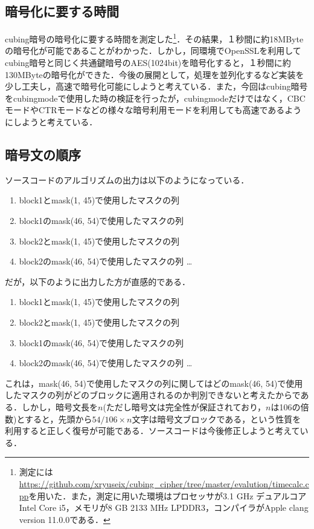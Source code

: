 \documentclass[a4j,titlepage]{jsarticle}
\begin{document}
\subsection{暗号化に要する時間}
cubing暗号の暗号化に要する時間を測定した\footnote{測定には\url{https://github.com/xryuseix/cubing_cipher/tree/master/evalution/timecalc.cpp}を用いた．また，測定に用いた環境はプロセッサが3.1 GHz デュアルコアIntel Core i5，メモリが8 GB 2133 MHz LPDDR3，コンパイラがApple clang version 11.0.0である．}．その結果，１秒間に約18MByteの暗号化が可能であることがわかった．しかし，同環境でOpenSSLを利用してcubing暗号と同じく共通鍵暗号のAES(1024bit)を暗号化すると，１秒間に約130MByteの暗号化ができた．今後の展開として，処理を並列化するなど実装を少し工夫し，高速で暗号化可能にしようと考えている．また，今回はcubing暗号をcubingmodeで使用した時の検証を行ったが，cubingmodeだけではなく，CBCモードやCTRモードなどの様々な暗号利用モードを利用しても高速であるようにしようと考えている．

\subsection{暗号文の順序}
ソースコードのアルゴリズムの出力は以下のようになっている．\\
\begin{screen}
  \begin{enumerate}
    \item block1とmask(\phantom{0}1, 45)で使用したマスクの列
    \item block1のmask(46, 54)で使用したマスクの列
    \item block2とmask(\phantom{0}1, 45)で使用したマスクの列
    \item block2のmask(46, 54)で使用したマスクの列 \dots
  \end{enumerate}
\end{screen}
だが，以下のように出力した方が直感的である．
\begin{screen}
  \begin{enumerate}
    \item block1とmask(\phantom{0}1, 45)で使用したマスクの列
    \item block2とmask(\phantom{0}1, 45)で使用したマスクの列
    \item block1のmask(46, 54)で使用したマスクの列
    \item block2のmask(46, 54)で使用したマスクの列 \dots
  \end{enumerate}
\end{screen}
これは，mask(46, 54)で使用したマスクの列に関してはどのmask(46, 54)で使用したマスクの列がどのブロックに適用されるのか判別できないと考えたからである．しかし，暗号文長を\(n\)(ただし暗号文は完全性が保証されており，\(n\)は106の倍数)とすると，先頭から\(54/106 \times n\)文字は暗号文ブロックである，という性質を利用すると正しく復号が可能である．ソースコードは今後修正しようと考えている．
\end{document}
